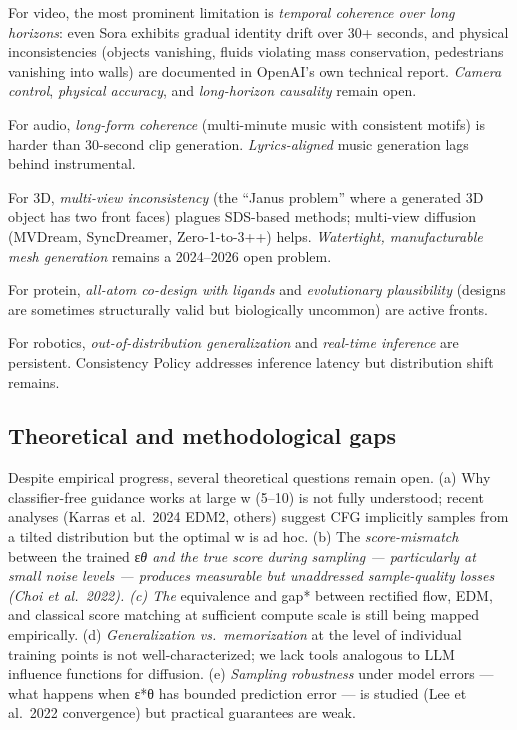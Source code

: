 For video, the most prominent limitation is \emph{temporal coherence over long horizons}: even Sora exhibits gradual identity drift over 30+ seconds, and physical inconsistencies (objects vanishing, fluids violating mass conservation, pedestrians vanishing into walls) are documented in OpenAI's own technical report. \emph{Camera control}, \emph{physical accuracy}, and \emph{long-horizon causality} remain open.

For audio, \emph{long-form coherence} (multi-minute music with consistent motifs) is harder than 30-second clip generation. \emph{Lyrics-aligned} music generation lags behind instrumental.

For 3D, \emph{multi-view inconsistency} (the ``Janus problem'' where a generated 3D object has two front faces) plagues SDS-based methods; multi-view diffusion (MVDream, SyncDreamer, Zero-1-to-3++) helps. \emph{Watertight, manufacturable mesh generation} remains a 2024--2026 open problem.

For protein, \emph{all-atom co-design with ligands} and \emph{evolutionary plausibility} (designs are sometimes structurally valid but biologically uncommon) are active fronts.

For robotics, \emph{out-of-distribution generalization} and \emph{real-time inference} are persistent. Consistency Policy addresses inference latency but distribution shift remains.

\subsection{Theoretical and methodological gaps}\label{theoretical-and-methodological-gaps}

Despite empirical progress, several theoretical questions remain open. (a) Why classifier-free guidance works at large w (5--10) is not fully understood; recent analyses (Karras et al.~2024 EDM2, others) suggest CFG implicitly samples from a tilted distribution but the optimal w is ad hoc. (b) The \emph{score-mismatch} between the trained ε\emph{θ and the true score during sampling --- particularly at small noise levels --- produces measurable but unaddressed sample-quality losses (Choi et al.~2022). (c) The }equivalence and gap* between rectified flow, EDM, and classical score matching at sufficient compute scale is still being mapped empirically. (d) \emph{Generalization vs.~memorization} at the level of individual training points is not well-characterized; we lack tools analogous to LLM influence functions for diffusion. (e) \emph{Sampling robustness} under model errors --- what happens when ε*θ has bounded prediction error --- is studied (Lee et al.~2022 convergence) but practical guarantees are weak.

